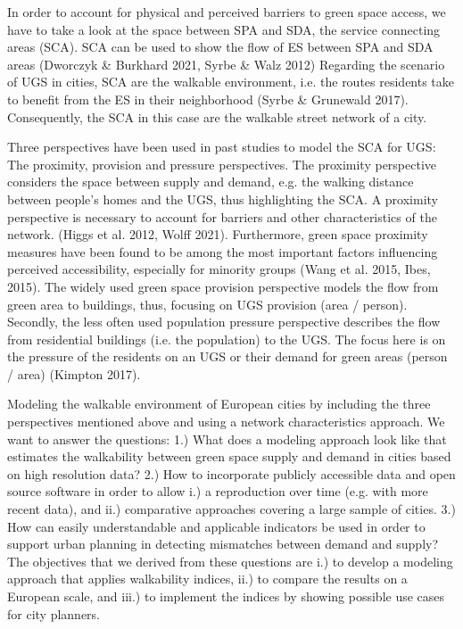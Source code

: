 \documentclass[10pt]{article}
\begin{document}
In order to account for physical and perceived barriers to green space access, we have to take a look at the space between SPA and SDA, the service connecting areas (SCA).
SCA can be used to show the flow of ES between SPA and SDA areas (Dworczyk \& Burkhard 2021, Syrbe \& Walz 2012)
Regarding the scenario of UGS in cities, SCA are the walkable environment, i.e. the routes residents take to benefit from the ES in their neighborhood (Syrbe \& Grunewald 2017).
Consequently, the SCA in this case are the walkable street network of a city.

Three perspectives have been used in past studies to model the SCA for UGS: The proximity, provision and pressure perspectives.
The proximity perspective considers the space between supply and demand, e.g. the walking distance between people’s homes and the UGS, thus highlighting the SCA. 
A proximity perspective is necessary to account for barriers and other characteristics of the network. (Higgs et al. 2012, Wolff 2021).
Furthermore, green space proximity measures have been found to be among the most important factors influencing perceived accessibility, especially for minority groups (Wang et al. 2015, Ibes, 2015).
The widely used green space provision perspective models the flow from green area to buildings, thus, focusing on UGS provision (area / person).
Secondly, the less often used population pressure perspective describes the flow from residential buildings (i.e. the population) to the UGS.
The focus here is on the pressure of the residents on an UGS or their demand for green areas (person / area) (Kimpton 2017).


Modeling the walkable environment of European cities by including the three perspectives mentioned above and using a network characteristics approach.
We want to answer the questions:
    1.) What does a modeling approach look like that estimates the walkability between green space supply and demand in cities based on high resolution data? 
    2.) How to incorporate publicly accessible data and open source software in order to allow i.) a reproduction over time (e.g. with more recent data), and ii.) comparative approaches covering a large sample of cities.
    3.) How can easily understandable and applicable indicators be used in order to support urban planning in detecting mismatches between demand and supply?
The objectives that we derived from these questions are i.) to develop a modeling approach that applies walkability indices, ii.) to compare the results on a European scale, and iii.) to implement the indices by showing possible use cases for city planners.
\end{document}
